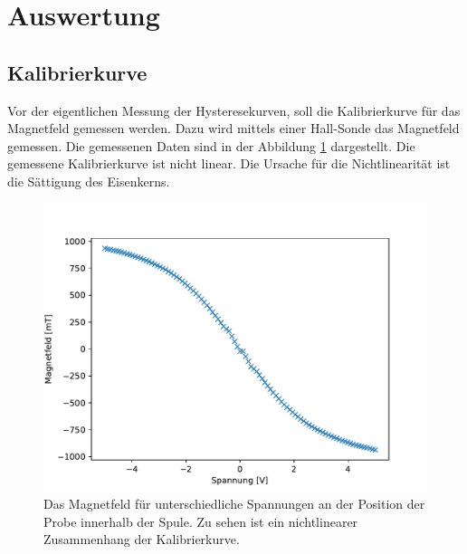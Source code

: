\section{Auswertung}
\subsection{Kalibrierkurve}
Vor der eigentlichen Messung der Hysteresekurven, soll die Kalibrierkurve für das Magnetfeld gemessen werden. Dazu wird mittels einer Hall-Sonde das Magnetfeld gemessen. Die gemessenen Daten sind in der Abbildung \ref{fig:Kalibrierung} dargestellt. Die gemessene Kalibrierkurve ist nicht linear. Die Ursache für die Nichtlinearität ist die Sättigung des Eisenkerns. 
\begin{figure}[H]
\centering
\includegraphics[scale=0.8]{../Messdaten/auswertung/Kalibrierung.pdf}
\caption{ Das Magnetfeld für unterschiedliche Spannungen an der Position der Probe innerhalb der Spule. Zu sehen ist ein nichtlinearer Zusammenhang der Kalibrierkurve. }
\label{fig:Kalibrierung}
\end{figure}


